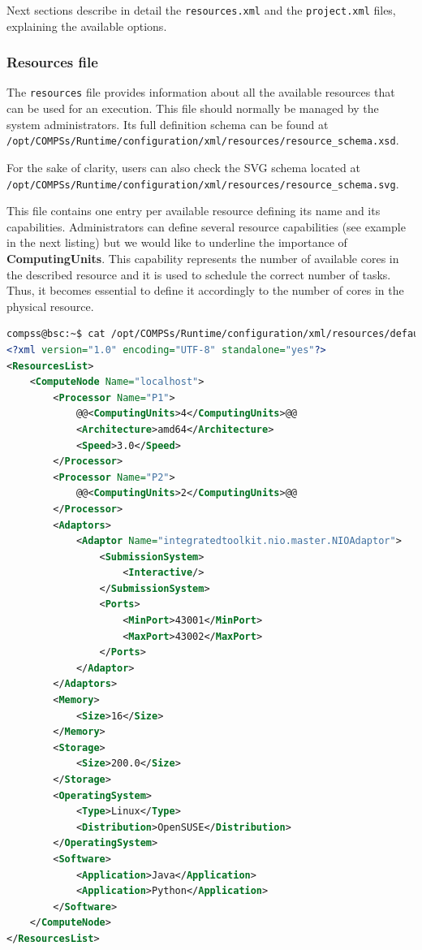Next sections describe in detail the \texttt{resources.xml} and the \texttt{project.xml} files, 
explaining the available options.

\subsubsection{Resources file}
The \texttt{resources} file provides information about all the available resources that can be used for an execution. 
This file should normally be managed by the system administrators. Its full definition schema can be found at \\
\texttt{/opt/COMPSs/Runtime/configuration/xml/resources/resource\_schema.xsd}. 

For the sake of clarity, users can also check the SVG schema located at \\
\texttt{/opt/COMPSs/Runtime/configuration/xml/resources/resource\_schema.svg}.

This file contains one entry per available resource defining its name and its capabilities. Administrators can define several
resource capabilities (see example in the next listing) but we would like to underline the importance of 
\textbf{ComputingUnits}. This capability represents the number of available cores in the described resource and it is
used to schedule the correct number of tasks. Thus, it becomes essential to define it accordingly to the number of cores 
in the physical resource. 

\begin{lstlisting}[language=xml,moredelim={[is][\textcolor{red}]{@@}{@@}}]
compss@bsc:~$ cat /opt/COMPSs/Runtime/configuration/xml/resources/default_resources.xml
<?xml version="1.0" encoding="UTF-8" standalone="yes"?>
<ResourcesList>
    <ComputeNode Name="localhost">
        <Processor Name="P1">
            @@<ComputingUnits>4</ComputingUnits>@@
            <Architecture>amd64</Architecture>
            <Speed>3.0</Speed>
        </Processor>
        <Processor Name="P2">
            @@<ComputingUnits>2</ComputingUnits>@@
        </Processor>
        <Adaptors>
            <Adaptor Name="integratedtoolkit.nio.master.NIOAdaptor">
                <SubmissionSystem>
                    <Interactive/>
                </SubmissionSystem>
                <Ports>
                    <MinPort>43001</MinPort>
                    <MaxPort>43002</MaxPort>
                </Ports>
            </Adaptor>
        </Adaptors>
        <Memory>
            <Size>16</Size>
        </Memory>
        <Storage>
            <Size>200.0</Size>
        </Storage>
        <OperatingSystem>
            <Type>Linux</Type>
            <Distribution>OpenSUSE</Distribution>
        </OperatingSystem>
        <Software>
            <Application>Java</Application>
            <Application>Python</Application>
        </Software>
    </ComputeNode>
</ResourcesList>
\end{lstlisting}


